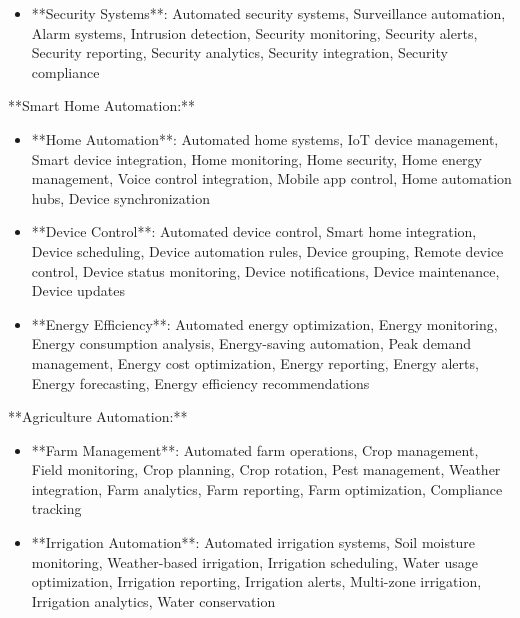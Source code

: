 \documentclass[11pt,a4paper]{article}
\begin{document}
\begin{itemize}
\item **Security Systems**: Automated security systems, Surveillance automation, Alarm systems, Intrusion detection, Security monitoring, Security alerts, Security reporting, Security analytics, Security integration, Security compliance
\end{itemize}

**Smart Home Automation:**

\begin{itemize}
\item **Home Automation**: Automated home systems, IoT device management, Smart device integration, Home monitoring, Home security, Home energy management, Voice control integration, Mobile app control, Home automation hubs, Device synchronization
\end{itemize}

\begin{itemize}
\item **Device Control**: Automated device control, Smart home integration, Device scheduling, Device automation rules, Device grouping, Remote device control, Device status monitoring, Device notifications, Device maintenance, Device updates
\end{itemize}

\begin{itemize}
\item **Energy Efficiency**: Automated energy optimization, Energy monitoring, Energy consumption analysis, Energy-saving automation, Peak demand management, Energy cost optimization, Energy reporting, Energy alerts, Energy forecasting, Energy efficiency recommendations
\end{itemize}

**Agriculture Automation:**

\begin{itemize}
\item **Farm Management**: Automated farm operations, Crop management, Field monitoring, Crop planning, Crop rotation, Pest management, Weather integration, Farm analytics, Farm reporting, Farm optimization, Compliance tracking
\end{itemize}

\begin{itemize}
\item **Irrigation Automation**: Automated irrigation systems, Soil moisture monitoring, Weather-based irrigation, Irrigation scheduling, Water usage optimization, Irrigation reporting, Irrigation alerts, Multi-zone irrigation, Irrigation analytics, Water conservation
\end{itemize}
\end{document}
